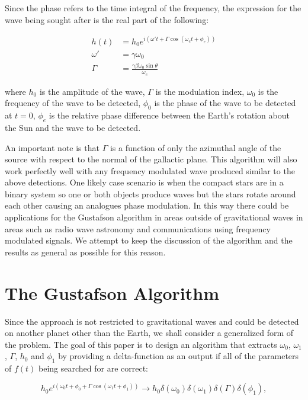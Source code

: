 \documentclass[onecolumn, groupedaddress, 10pt]{revtex4-1}
\begin{document}
Since the phase refers to the time integral of the frequency, the expression for the wave being sought after is the real part of the following: 

\begin{align}
h(t)    &= h_0 e^{i \left( \omega' t + \Gamma \cos (\omega_e t + \phi_e) \right)}		\\
\omega' &= \gamma \omega_0															\\
\Gamma  &= \frac{\gamma \beta \omega_0 \sin \theta}{\omega_e}
\end{align}


where $h_0$ is the amplitude of the wave, $\Gamma$ is the modulation index, $\omega_0$ is the frequency of the wave to be detected, $\phi_0$ is the phase of the wave to be detected at $t=0$, $\phi_e$ is the relative phase difference between the Earth's rotation about the Sun and the wave to be detected.

An important note is that $\Gamma$ is a function of only the azimuthal angle of the source with respect to the normal of the gallactic plane. This algorithm will also work perfectly well with any frequency modulated wave produced similar to the above detections. One likely case scenario is when the compact stars are in a binary system so one or both objects produce waves but the stars rotate around each other causing an analogues phase modulation.  In this way there could be applications for the Gustafson algorithm in areas outside of gravitational waves in areas such as radio wave astronomy and communications using frequency modulated signals. We attempt to keep the discussion of the algorithm and the results as general as possible for this reason.

\section{The Gustafson Algorithm}
Since the approach is not restricted to gravitational waves and could be detected on another planet other than the Earth, we shall consider a generalized form of the problem. The goal of this paper is to design an algorithm that extracts $\omega_0$, $\omega_1$, $\Gamma$, $h_0$ and $\phi_1$ by providing a delta-function as an output if all of the parameters of $f(t)$ being searched for are correct:

\begin{equation}
h_0 e^{i\left( \omega_0 t + \phi_0 + \Gamma \cos (\omega_1 t + \phi_1 ) \right)} \to h_0 \delta (\omega_0) \delta (\omega_1 ) \delta (\Gamma ) \delta(\phi_1),
\end{equation}
\end{document}
